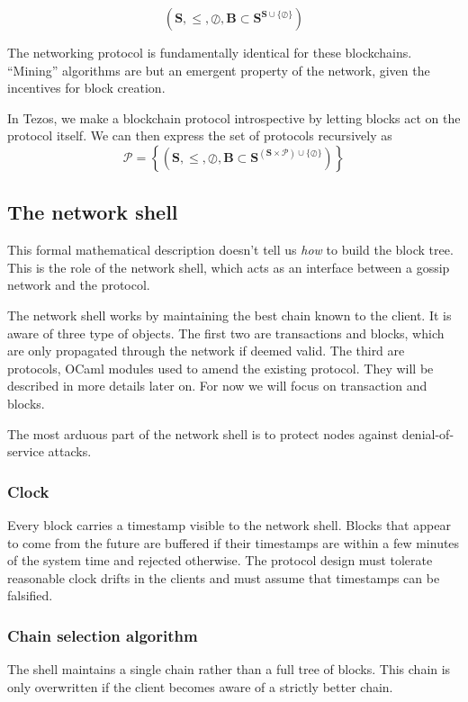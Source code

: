 \documentclass[letterpaper]{article}
\begin{document}
$$\left(\mathbf{S},\leq,\oslash,
\mathbf{B} \subset \mathbf{S}^{\mathbf{S} \cup \{\oslash\}}\right)$$

The networking protocol is fundamentally identical for these blockchains.
``Mining'' algorithms are but an emergent property of the network,
given the incentives for block creation.

In Tezos, we make a blockchain protocol introspective 
by letting blocks act on the protocol itself.
We can then express the set of protocols recursively as
$$\mathcal{P} = \left\{\left(\mathbf{S},\leq,\oslash,\mathbf{B} \subset
\mathbf{S}^{(\mathbf{S} \times \mathcal{P})\cup \{\oslash\}} \right)\right\}$$


\subsection{The network shell}
This formal mathematical description doesn't tell us \emph{how} to build the
block tree. This is the role of the network shell, which acts as an interface
between a gossip network and the protocol.

The network shell works by maintaining the best chain known to the client. It is
aware of three type of objects. The first two are transactions and blocks, which
are only propagated through the network if deemed valid. The third are
protocols, OCaml modules used to amend the existing protocol. They will be
described in more details later on. For now we will focus on transaction and
blocks.

The most arduous part of the network shell is to protect nodes against
denial-of-service attacks.

\subsubsection{Clock}
Every block carries a timestamp visible to the network shell. Blocks that appear
to come from the future are buffered if their timestamps are within a few
minutes of the system time and rejected otherwise. The protocol design must
tolerate reasonable clock drifts in the clients and must assume that timestamps
can be falsified.

\subsubsection{Chain selection algorithm}
The shell maintains a single chain rather than a full tree of blocks. This chain
is only overwritten if the client becomes aware of a strictly better chain.
\end{document}
